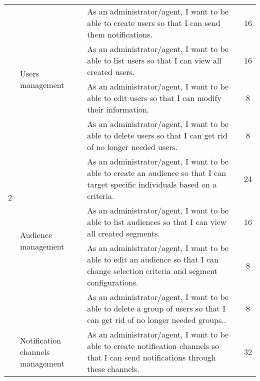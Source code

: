 \begin{longtable}{ | m{}  | m{} | m{} | c | }
    \cline{2-4}
                            & \multirow{4}{5em}{Users management}                 & As an administrator/agent, I want to be able to create users so that I can send them notifications.                                   & 16                  \\
    \cline{3-4}
                            &                                                     & As an administrator/agent, I want to be able to list users so that I can view all created users.                                      & 16                  \\
    \cline{3-4}
                            &                                                     & As an administrator/agent, I want to be able to edit users so that I can modify their information.                                    & 8                   \\
    \cline{3-4}
                            &                                                     & As an administrator/agent, I want to be able to delete users so that I can get rid of no longer needed users.                         & 8                   \\
    \hline
    \multirow[t]{2}{5em}{2} & \multirow{4}{5em}{Audience management}              & As an administrator/agent, I want to be able to create an audience so that I can target specific individuals based on a criteria.     & 24                  \\
    \cline{3-4}
                            &                                                     & As an administrator/agent, I want to be able to list audiences so that I can view all created segments.                               & 16                  \\
    \cline{3-4}
                            &                                                     & As an administrator/agent, I want to be able to edit an audience so that I can change selection criteria and segment configurations.  & 8                   \\
    \cline{3-4}
                            &                                                     & As an administrator/agent, I want to be able to delete a group of users so that I can get rid of no longer needed groups..            & 8                   \\
    \cline{2-4}
                            & \multirow{4}{5em}{Notification channels management} & As an administrator/agent, I want to be able to create notification channels so that I can send notifications through these channels. & 32                  \\

\end{longtable}
